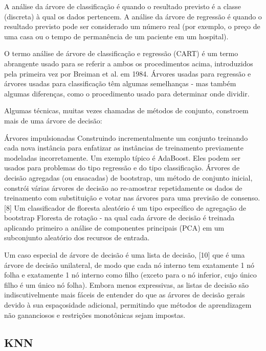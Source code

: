 \documentclass{article}
\begin{document}
    A análise da árvore de classificação é quando o resultado previsto é a classe (discreta) à qual os dados pertencem.
    A análise da árvore de regressão é quando o resultado previsto pode ser considerado um número real (por exemplo, o preço de uma casa ou o tempo de permanência de um paciente em um hospital).

O termo análise de árvore de classificação e regressão (CART) é um termo abrangente usado para se referir a ambos os procedimentos acima, introduzidos pela primeira vez por Breiman et al. em 1984. Árvores usadas para regressão e árvores usadas para classificação têm algumas semelhanças - mas também algumas diferenças, como o procedimento usado para determinar onde dividir.

Algumas técnicas, muitas vezes chamadas de métodos de conjunto, constroem mais de uma árvore de decisão:

Árvores impulsionadas Construindo incrementalmente um conjunto treinando cada nova instância para enfatizar as instâncias de treinamento previamente modeladas incorretamente. Um exemplo típico é AdaBoost. Eles podem ser usados para problemas do tipo regressão e do tipo classificação.
Árvores de decisão agregadas (ou ensacadas) de bootstrap, um método de conjunto inicial, constrói várias árvores de decisão ao re-amostrar repetidamente os dados de treinamento com substituição e votar nas árvores para uma previsão de consenso. [8]
Um classificador de floresta aleatório é um tipo específico de agregação de bootstrap 
Floresta de rotação - na qual cada árvore de decisão é treinada aplicando primeiro a análise de componentes principais (PCA) em um subconjunto aleatório dos recursos de entrada.

Um caso especial de árvore de decisão é uma lista de decisão, [10] que é uma árvore de decisão unilateral, de modo que cada nó interno tem exatamente 1 nó folha e exatamente 1 nó interno como filho (exceto para o nó inferior, cujo único filho é um único nó folha). Embora menos expressivas, as listas de decisão são indiscutivelmente mais fáceis de entender do que as árvores de decisão gerais devido à sua espaçosidade adicional, permitindo que métodos de aprendizagem não gananciosos  e restrições monotônicas sejam impostas.

\subsection{KNN}
\end{document}
